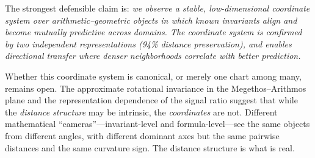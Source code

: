 \documentclass[11pt,a4paper]{article}
\begin{document}
The strongest defensible claim is: \emph{we observe a stable, low-dimensional coordinate system over arithmetic--geometric objects in which known invariants align and become mutually predictive across domains. The coordinate system is confirmed by two independent representations (94\% distance preservation), and enables directional transfer where denser neighborhoods correlate with better prediction.}

Whether this coordinate system is canonical, or merely one chart among many, remains open. The approximate rotational invariance in the Megethos--Arithmos plane and the representation dependence of the signal ratio suggest that while the \emph{distance structure} may be intrinsic, the \emph{coordinates} are not. Different mathematical ``cameras''---invariant-level and formula-level---see the same objects from different angles, with different dominant axes but the same pairwise distances and the same curvature sign. The distance structure is what is real.
\end{document}
